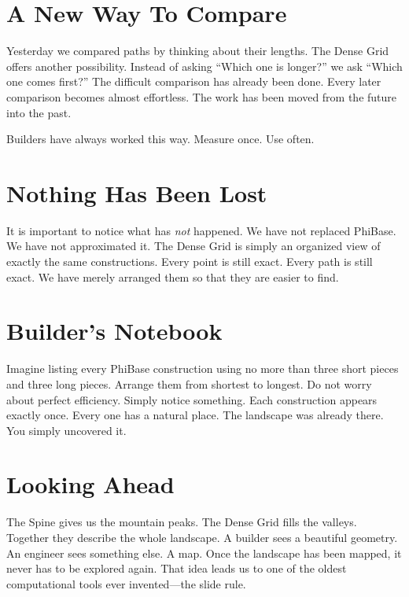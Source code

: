 \section*{A New Way To Compare}

Yesterday we compared paths by thinking about their lengths. The Dense Grid offers another possibility. Instead of asking ``Which one is longer?'' we ask ``Which one comes first?'' The difficult comparison has already been done. Every later comparison becomes almost effortless. The work has been moved from the future into the past.

Builders have always worked this way. Measure once. Use often.

\section*{Nothing Has Been Lost}

It is important to notice what has \emph{not} happened. We have not replaced PhiBase. We have not approximated it. The Dense Grid is simply an organized view of exactly the same constructions. Every point is still exact. Every path is still exact. We have merely arranged them so that they are easier to find.

\section*{Builder's Notebook}

Imagine listing every PhiBase construction using no more than three short pieces and three long pieces. Arrange them from shortest to longest. Do not worry about perfect efficiency. Simply notice something. Each construction appears exactly once. Every one has a natural place. The landscape was already there. You simply uncovered it.

\section*{Looking Ahead}

The Spine gives us the mountain peaks. The Dense Grid fills the valleys. Together they describe the whole landscape. A builder sees a beautiful geometry. An engineer sees something else. A map. Once the landscape has been mapped, it never has to be explored again. That idea leads us to one of the oldest computational tools ever invented---the slide rule.

